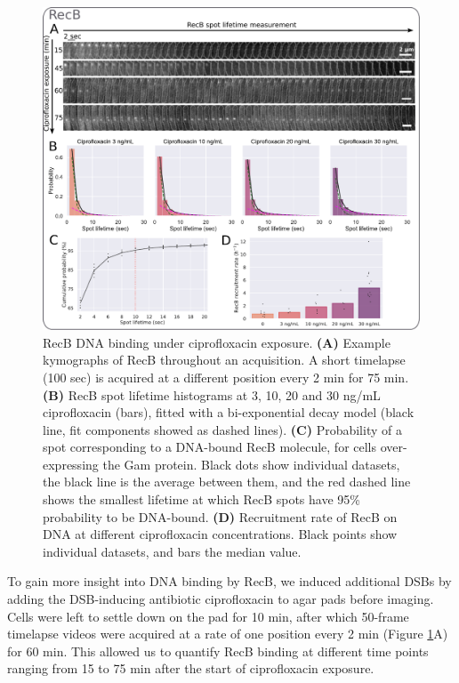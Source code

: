 \begin{figure}[htbp]
    \centering
    \includegraphics[width=.8\textwidth]{Figures/Fig2_RecB_binding.pdf}
    \caption{RecB DNA binding under ciprofloxacin exposure. \textbf{(A)} Example kymographs of RecB throughout an acquisition. A short timelapse (100 sec) is acquired at a different position every 2 min for 75 min. \textbf{(B)} RecB spot lifetime histograms at 3, 10, 20 and 30 ng/mL ciprofloxacin (bars), fitted with a bi-exponential decay model (black line, fit components showed as dashed lines). \textbf{(C)} Probability of a spot corresponding to a DNA-bound RecB molecule, for cells over-expressing the Gam protein. Black dots show individual datasets, the black line is the average between them, and the red dashed line shows the smallest lifetime at which RecB spots have 95\% probability to be DNA-bound. \textbf{(D)} Recruitment rate of RecB on DNA at different ciprofloxacin concentrations. Black points show individual datasets, and bars the median value.}
    \label{Fig:lifetime_fits}
\end{figure}

To gain more insight into DNA binding by RecB, we induced additional DSBs by adding the DSB-inducing antibiotic ciprofloxacin to agar pads before imaging. Cells were left to settle down on the pad for 10 min, after which 50-frame timelapse videos were acquired at a rate of one position every 2 min (Figure \ref{Fig:lifetime_fits}A) for 60 min. This allowed us to quantify RecB binding at different time points ranging from 15 to 75 min after the start of ciprofloxacin exposure.

